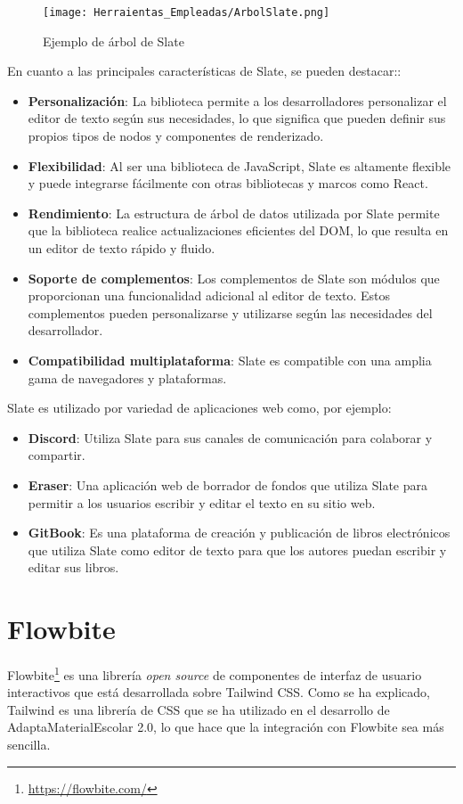 \begin{figure}[ht!]
  \centering
  \texttt{[image: Herraientas\_Empleadas/ArbolSlate.png]}
  \caption{Ejemplo de árbol de Slate}
  \label{fig:arbolSlate}
\end{figure}

En cuanto a las principales características de Slate, se pueden destacar::

\begin{itemize}
  \item \textbf{Personalización}: La biblioteca permite a los desarrolladores personalizar el editor de texto según sus necesidades, lo que significa que pueden definir sus propios tipos de nodos y componentes de renderizado.
  \item \textbf{Flexibilidad}: Al ser una biblioteca de JavaScript, Slate es altamente flexible y puede integrarse fácilmente con otras bibliotecas y marcos como React.
  \item \textbf{Rendimiento}: La estructura de árbol de datos utilizada por Slate permite que la biblioteca realice actualizaciones eficientes del DOM, lo que resulta en un editor de texto rápido y fluido.
  \item \textbf{Soporte de complementos}: Los complementos de Slate son módulos que proporcionan una funcionalidad adicional al editor de texto. Estos complementos pueden personalizarse y utilizarse según las necesidades del desarrollador.
  \item \textbf{Compatibilidad multiplataforma}: Slate es compatible con una amplia gama de navegadores y plataformas.
\end{itemize}

Slate es utilizado por variedad de aplicaciones web como, por ejemplo:
\begin{itemize}
  \item \textbf{Discord}: Utiliza Slate para sus canales de comunicación para colaborar y compartir.
  \item \textbf{Eraser}: Una aplicación web de borrador de fondos que utiliza Slate para permitir a los usuarios escribir y editar el texto en su sitio web.
  \item \textbf{GitBook}: Es una plataforma de creación y publicación de libros electrónicos que utiliza Slate como editor de texto para que los autores puedan escribir y editar sus libros.
\end{itemize}

\section{Flowbite}\label{sec:Flowbite}
Flowbite\footnote{\url{https://flowbite.com/}} es una librería \textit{open source} de componentes de interfaz de usuario interactivos que está desarrollada sobre Tailwind CSS. Como se ha explicado, Tailwind es una librería de CSS que se ha utilizado en el desarrollo de AdaptaMaterialEscolar 2.0, lo que hace que la integración con Flowbite sea más sencilla.

